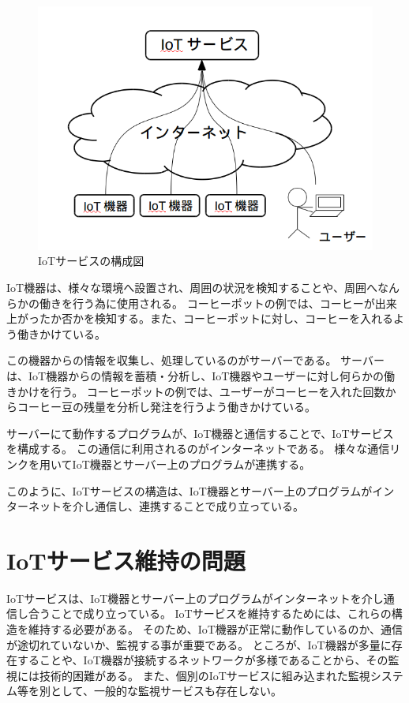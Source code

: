 \begin{figure}[htbp]
\includegraphics[width=16cm]{images/IoTservice.png}
\caption{IoTサービスの構成図}
\label{fig:IoTservice}
\end{figure}

IoT機器は、様々な環境へ設置され、周囲の状況を検知することや、周囲へなんらかの働きを行う為に使用される。
コーヒーポットの例では、コーヒーが出来上がったか否かを検知する。また、コーヒーポットに対し、コーヒーを入れるよう働きかけている。
\medskip

この機器からの情報を収集し、処理しているのがサーバーである。
サーバーは、IoT機器からの情報を蓄積・分析し、IoT機器やユーザーに対し何らかの働きかけを行う。
コーヒーポットの例では、ユーザーがコーヒーを入れた回数からコーヒー豆の残量を分析し発注を行うよう働きかけている。
\medskip

サーバーにて動作するプログラムが、IoT機器と通信することで、IoTサービスを構成する。
この通信に利用されるのがインターネットである。
様々な通信リンクを用いてIoT機器とサーバー上のプログラムが連携する。
\medskip

このように、IoTサービスの構造は、IoT機器とサーバー上のプログラムがインターネットを介し通信し、連携することで成り立っている。

\section{IoTサービス維持の問題}
IoTサービスは、IoT機器とサーバー上のプログラムがインターネットを介し通信し合うことで成り立っている。
IoTサービスを維持するためには、これらの構造を維持する必要がある。
そのため、IoT機器が正常に動作しているのか、通信が途切れていないか、監視する事が重要である。
ところが、IoT機器が多量に存在することや、IoT機器が接続するネットワークが多様であることから、その監視には技術的困難がある。
また、個別のIoTサービスに組み込まれた監視システム等を別として、一般的な監視サービスも存在しない。
\medskip

